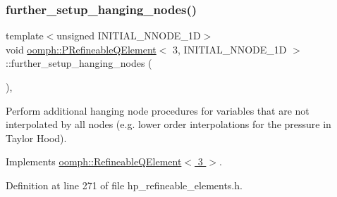 \subsubsection{\texorpdfstring{further\+\_\+setup\+\_\+hanging\+\_\+nodes()}{further\_setup\_hanging\_nodes()}}
{\footnotesize\ttfamily template$<$unsigned I\+N\+I\+T\+I\+A\+L\+\_\+\+N\+N\+O\+D\+E\+\_\+1D$>$ \\
void \hyperlink{classoomph_1_1PRefineableQElement}{oomph\+::\+P\+Refineable\+Q\+Element}$<$ 3, I\+N\+I\+T\+I\+A\+L\+\_\+\+N\+N\+O\+D\+E\+\_\+1D $>$\+::further\+\_\+setup\+\_\+hanging\+\_\+nodes (\begin{DoxyParamCaption}{ }\end{DoxyParamCaption})\hspace{0.3cm}{\ttfamily [inline]}, {\ttfamily [virtual]}}



Perform additional hanging node procedures for variables that are not interpolated by all nodes (e.\+g. lower order interpolations for the pressure in Taylor Hood). 



Implements \hyperlink{classoomph_1_1RefineableQElement_3_013_01_4_aae91537ebb3f511bf48397b3324f424a}{oomph\+::\+Refineable\+Q\+Element$<$ 3 $>$}.



Definition at line 271 of file hp\+\_\+refineable\+\_\+elements.\+h.

\mbox{\label{classoomph_1_1PRefineableQElement_3_013_00_01INITIAL__NNODE__1D_01_4_ad641bd9cd4e858dfa97a8d59eebea354}} 

